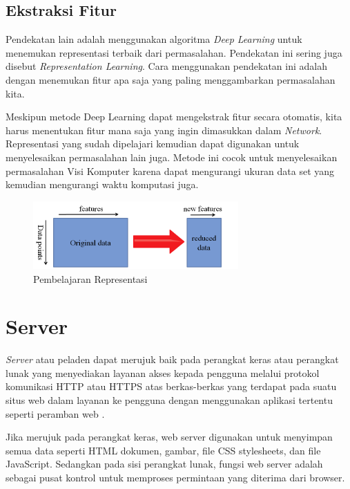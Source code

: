 \subsection{Ekstraksi Fitur}
\par Pendekatan lain adalah menggunakan algoritma \textit{Deep Learning} untuk menemukan representasi terbaik dari permasalahan. Pendekatan ini sering juga disebut \textit{Representation Learning}.  Cara menggunakan pendekatan ini adalah dengan menemukan fitur apa saja yang paling menggambarkan permasalahan kita. 
\par Meskipun metode Deep Learning dapat mengekstrak fitur secara otomatis, kita harus menentukan fitur mana saja yang ingin dimasukkan dalam \textit{Network}. Representasi yang sudah dipelajari kemudian dapat digunakan untuk menyelesaikan permasalahan lain juga. Metode ini cocok untuk menyelesaikan permasalahan Visi Komputer karena dapat mengurangi ukuran data set yang kemudian mengurangi waktu komputasi juga\cite{transfer_how}.

\begin{figure}[ht]
	\centering\includegraphics[width=0.7\textwidth]{bab2/figures/rep_features.png}
	\caption{Pembelajaran Representasi}
	\label{fig:rep-works}
\end{figure}

\section{Server}
\par \textit{Server} atau peladen dapat merujuk baik pada perangkat keras atau perangkat lunak yang menyediakan layanan akses kepada pengguna melalui protokol komunikasi HTTP atau HTTPS atas berkas-berkas yang terdapat pada suatu situs web dalam layanan ke pengguna dengan menggunakan aplikasi tertentu seperti peramban web \cite{webserver_def}.

\par Jika merujuk pada perangkat keras, web server digunakan untuk menyimpan semua data seperti HTML dokumen, gambar, file CSS stylesheets, dan file JavaScript. Sedangkan pada sisi perangkat lunak, fungsi web server adalah sebagai pusat kontrol untuk memproses permintaan yang diterima dari browser.


